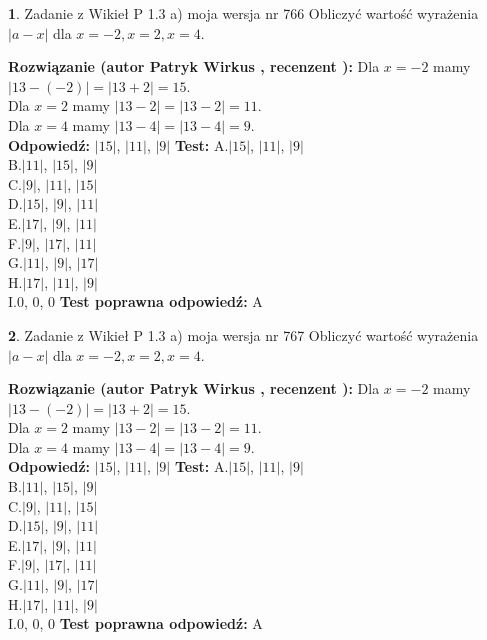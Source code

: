 \documentclass[12pt, a4paper]{article}
\theoremstyle{definition} %
\newtheorem{zad}{}
\newcommand{\zadStart}[1]{\begin{zad}#1\newline}
\newcommand{\zadStop}{\end{zad}}
\newcommand{\rozwStart}[2]{\noindent \textbf{Rozwiązanie (autor #1 , recenzent #2): }\newline}
\newcommand{\rozwStop}{\newline}
\newcommand{\odpStart}{\noindent \textbf{Odpowiedź:}\newline}
\newcommand{\odpStop}{\newline}
\newcommand{\testStart}{\noindent \textbf{Test:}\newline}
\newcommand{\testStop}{\newline}
\newcommand{\kluczStart}{\noindent \textbf{Test poprawna odpowiedź:}\newline}
\newcommand{\kluczStop}{\newline}
\begin{document}
\zadStart{Zadanie z Wikieł P 1.3 a) moja wersja nr 766}
Obliczyć wartość wyrażenia $|a - x|$ dla $x=-2,x=2,x=4$.
\zadStop
\rozwStart{Patryk Wirkus}{}
Dla $x = -2$ mamy $|13 - (-2)| = |13 + 2| = 15$.\\
Dla $x = 2$ mamy $|13 - 2| = |13 - 2| = 11$.\\
Dla $x = 4$ mamy $|13 - 4| = |13 - 4| = 9$.\\
\rozwStop
\odpStart
$|15|$, $|11|$, $|9|$
\odpStop
\testStart
A.$|15|$, $|11|$, $|9|$\\
B.$|11|$, $|15|$, $|9|$\\
C.$|9|$, $|11|$, $|15|$\\
D.$|15|$, $|9|$, $|11|$\\
E.$|17|$, $|9|$, $|11|$\\
F.$|9|$, $|17|$, $|11|$\\
G.$|11|$, $|9|$, $|17|$\\
H.$|17|$, $|11|$, $|9|$\\
I.$0$, $0$, $0$
\testStop
\kluczStart
A
\kluczStop



\zadStart{Zadanie z Wikieł P 1.3 a) moja wersja nr 767}
Obliczyć wartość wyrażenia $|a - x|$ dla $x=-2,x=2,x=4$.
\zadStop
\rozwStart{Patryk Wirkus}{}
Dla $x = -2$ mamy $|13 - (-2)| = |13 + 2| = 15$.\\
Dla $x = 2$ mamy $|13 - 2| = |13 - 2| = 11$.\\
Dla $x = 4$ mamy $|13 - 4| = |13 - 4| = 9$.\\
\rozwStop
\odpStart
$|15|$, $|11|$, $|9|$
\odpStop
\testStart
A.$|15|$, $|11|$, $|9|$\\
B.$|11|$, $|15|$, $|9|$\\
C.$|9|$, $|11|$, $|15|$\\
D.$|15|$, $|9|$, $|11|$\\
E.$|17|$, $|9|$, $|11|$\\
F.$|9|$, $|17|$, $|11|$\\
G.$|11|$, $|9|$, $|17|$\\
H.$|17|$, $|11|$, $|9|$\\
I.$0$, $0$, $0$
\testStop
\kluczStart
A
\kluczStop
\end{document}

